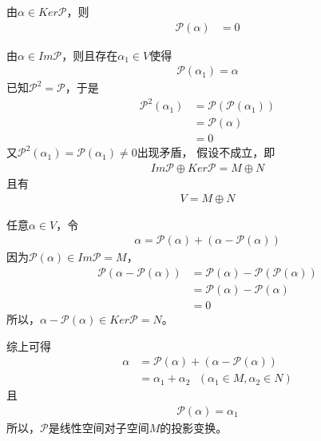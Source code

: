 \documentclass{article}
\begin{document}
\begin{itemize}
        由$\alpha \in Ker \mathscr{P}$，则
        \begin{align*}
          \mathscr{P}(\alpha) & = 0
        \end{align*}

        由$\alpha \in Im \mathscr{P}$，则且存在$\alpha_1 \in V$使得
        \begin{align*}
          \mathscr{P}(\alpha_1) = \alpha
        \end{align*}
        已知$\mathscr{P}^2 = \mathscr{P}$，于是
        \begin{align*}
          \mathscr{P}^2(\alpha_1)
           & = \mathscr{P}(\mathscr{P}(\alpha_1)) \\
           & = \mathscr{P}(\alpha)              \\
           & = 0
        \end{align*}
        又$ \mathscr{P}^2(\alpha_1) = \mathscr{P}(\alpha_1) \neq 0$出现矛盾，
        假设不成立，即
        \begin{align*}
          Im\mathscr{P} \oplus Ker\mathscr{P} = M \oplus N
        \end{align*}
        且有
        \begin{align*}
          V = M \oplus N
        \end{align*}

        任意$\alpha \in V$，令
        \begin{align*}
          \alpha = \mathscr{P}(\alpha) + (\alpha - \mathscr{P}(\alpha))
        \end{align*}
        因为$\mathscr{P}(\alpha) \in Im \mathscr{P} = M$，
        \begin{align*}
          \mathscr{P}(\alpha - \mathscr{P}(\alpha))
           & = \mathscr{P}(\alpha) - \mathscr{P}(\mathscr{P}(\alpha)) \\
           & = \mathscr{P}(\alpha) - \mathscr{P}(\alpha)              \\
           & = 0
        \end{align*}
        所以，$\alpha - \mathscr{P}(\alpha) \in Ker\mathscr{P} = N$。

        综上可得
        \begin{align*}
          \alpha
           & = \mathscr{P}(\alpha) + (\alpha - \mathscr{P}(\alpha))       \\
           & = \alpha_1 + \alpha_2 \ \ \ (\alpha_1 \in M, \alpha_2 \in N)
        \end{align*}
        且
        \begin{align*}
          \mathscr{P}( \alpha ) = \alpha_1
        \end{align*}
        所以，$\mathscr{P}$是线性空间对子空间$M$的投影变换。
\end{itemize}
\end{document}
